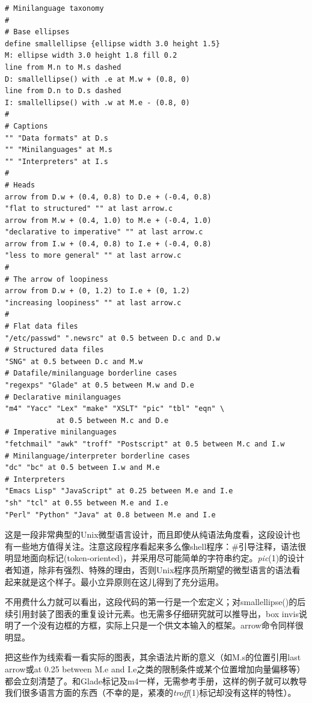 \documentclass[12pt,oneside]{book}
\begin{document}
\begin{Verbatim}[label=例8.4 语言分类图—pic源码]
# Minilanguage taxonomy
#
# Base ellipses
define smallellipse {ellipse width 3.0 height 1.5}
M: ellipse width 3.0 height 1.8 fill 0.2
line from M.n to M.s dashed
D: smallellipse() with .e at M.w + (0.8, 0)
line from D.n to D.s dashed
I: smallellipse() with .w at M.e - (0.8, 0)
#
# Captions
"" "Data formats" at D.s
"" "Minilanguages" at M.s
"" "Interpreters" at I.s
#
# Heads
arrow from D.w + (0.4, 0.8) to D.e + (-0.4, 0.8)
"flat to structured" "" at last arrow.c
arrow from M.w + (0.4, 1.0) to M.e + (-0.4, 1.0)
"declarative to imperative" "" at last arrow.c
arrow from I.w + (0.4, 0.8) to I.e + (-0.4, 0.8)
"less to more general" "" at last arrow.c
#
# The arrow of loopiness
arrow from D.w + (0, 1.2) to I.e + (0, 1.2)
"increasing loopiness" "" at last arrow.c
#
# Flat data files
"/etc/passwd" ".newsrc" at 0.5 between D.c and D.w
# Structured data files
"SNG" at 0.5 between D.c and M.w
# Datafile/minilanguage borderline cases
"regexps" "Glade" at 0.5 between M.w and D.e
# Declarative minilanguages
"m4" "Yacc" "Lex" "make" "XSLT" "pic" "tbl" "eqn" \
			at 0.5 between M.c and D.e
# Imperative minilanguages
"fetchmail" "awk" "troff" "Postscript" at 0.5 between M.c and I.w
# Minilanguage/interpreter borderline cases
"dc" "bc" at 0.5 between I.w and M.e
# Interpreters
"Emacs Lisp" "JavaScript" at 0.25 between M.e and I.e
"sh" "tcl" at 0.55 between M.e and I.e
"Perl" "Python" "Java" at 0.8 between M.e and I.e
\end{Verbatim}


这是一段非常典型的Unix微型语言设计，而且即使从纯语法角度看，这段设计也有一些地方值得关注。注意这段程序看起来多么像shell程序：\#{}引导注释，语法很明显地面向标记(token-oriented)，并采用尽可能简单的字符串约定。\textit{pic}(1)的设计者知道，除非有强烈、特殊的理由，否则Unix程序员所期望的微型语言的语法看起来就是这个样子。最小立异原则在这儿得到了充分运用。

不用费什么力就可以看出，这段代码的第一行是一个宏定义；对smallellipse()的后续引用封装了图表的重复设计元素。也无需多仔细研究就可以推导出，box invis说明了一个没有边框的方框，实际上只是一个供文本输入的框架。arrow命令同样很明显。

把这些作为线索看一看实际的图表，其余语法片断的意义（如M.s的位置引用last arrow或at 0.25 between M.e and I.e之类的限制条件或某个位置增加向量偏移等）都会立刻清楚了。和Glade标记及m4一样，无需参考手册，这样的例子就可以教导我们很多语言方面的东西（不幸的是，紧凑的\textit{troff}(1)标记却没有这样的特性）。
\end{document}
